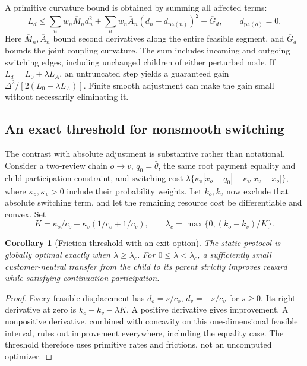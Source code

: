 \documentclass[11pt,letterpaper]{article}
\newtheorem{corollary}[theorem]{Corollary}
\theoremstyle{definition}
\newcommand{\1}{\mathbf 1}
\begin{document}
A primitive curvature bound is obtained by summing all affected terms:
\begin{equation}\label{eq:r10-curvature}
 L_d\leq\sum_n w_n\overline M_n d_n^2+
 \sum_n w_n\overline A_n(d_n-d_{\mathrm{pa}(n)})^2+\overline G_d,
 \qquad d_{\mathrm{pa}(o)}=0.
\end{equation}
Here $\overline M_n,\overline A_n$ bound second derivatives along the entire feasible segment, and $\overline G_d$ bounds the joint coupling curvature. The sum includes incoming and outgoing switching edges, including unchanged children of either perturbed node. If $L_d=L_0+\lambda L_A$, an untruncated step yields a guaranteed gain $\Delta^2/[2(L_0+\lambda L_A)]$. Finite smooth adjustment can make the gain small without necessarily eliminating it.

\subsection{An exact threshold for nonsmooth switching}
The contrast with absolute adjustment is substantive rather than notational. Consider a two-review chain $o\to v$, $q_0=\bar\theta$, the same root payment equality and child participation constraint, and switching cost
$\lambda\{\kappa_o|x_o-q_0|+\kappa_v|x_v-x_o|\}$, where $\kappa_o,\kappa_v>0$ include their probability weights. Let $k_o,k_v$ now exclude that absolute switching term, and let the remaining resource cost be differentiable and convex. Set
\[
 K=\kappa_o/c_o+\kappa_v(1/c_o+1/c_v),\qquad
 \lambda_c=\max\{0,(k_o-k_v)/K\}.
\]
\begin{corollary}[Friction threshold with an exit option]\label{cor:r10-threshold}
The static protocol is globally optimal exactly when $\lambda\geq\lambda_c$. For $0\leq\lambda<\lambda_c$, a sufficiently small customer-neutral transfer from the child to its parent strictly improves reward while satisfying continuation participation.
\end{corollary}
\begin{proof}
Every feasible displacement has $d_o=s/c_o$, $d_v=-s/c_v$ for $s\geq0$. Its right derivative at zero is $k_o-k_v-\lambda K$. A positive derivative gives improvement. A nonpositive derivative, combined with concavity on this one-dimensional feasible interval, rules out improvement everywhere, including the equality case. The threshold therefore uses primitive rates and frictions, not an uncomputed optimizer.
\end{proof}
\end{document}
